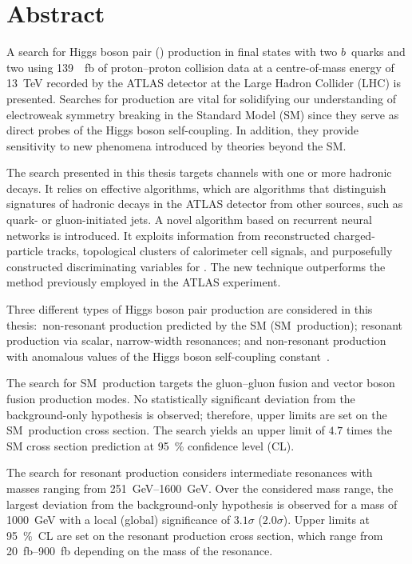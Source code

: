 \chapter*{Abstract}

A search for Higgs boson pair (\HH) production in final states with
two $b$~quarks and two \tauleptons using \SI{139}{\per\femto\barn} of
proton--proton collision data at a centre-of-mass energy of \SI{13}{\TeV}
recorded by the ATLAS detector at the Large Hadron Collider (LHC) is
presented. Searches for \HH production are vital for solidifying our
understanding of electroweak symmetry breaking in the Standard Model (SM) since
they serve as direct probes of the Higgs boson self-coupling. In addition, they
provide sensitivity to new phenomena introduced by theories beyond the SM.

The search presented in this thesis targets channels with one or more hadronic
\tauleptonC decays. It relies on effective \tauid algorithms, which are
algorithms that distinguish signatures of hadronic \tauleptonC decays in the
ATLAS detector from other sources, such as quark- or gluon-initiated jets. A
novel \tauid algorithm based on recurrent neural networks is introduced. It
exploits information from reconstructed charged-particle tracks, topological
clusters of calorimeter cell signals, and purposefully constructed
discriminating variables for \tauid. The new technique outperforms the method
previously employed in the ATLAS experiment.

Three different types of Higgs boson pair production are considered in this
thesis:~non-resonant \HH production predicted by the SM (SM~\HH production);
resonant \HH production via scalar, narrow-width resonances; and non-resonant
\HH production with anomalous values of the Higgs boson self-coupling
constant~\lambdahhh.

The search for SM~\HH production targets the gluon--gluon fusion and vector
boson fusion production modes. No statistically significant deviation from the
background-only hypothesis is observed; therefore, upper limits are set on the
SM~\HH production cross section. The search yields an upper limit of $4.7$ times
the SM cross section prediction at \SI{95}{\percent} confidence level (CL).

The search for resonant \HH production considers intermediate resonances with
masses ranging from \SIrange{251}{1600}{\GeV}. Over the considered mass range,
the largest deviation from the background-only hypothesis is observed for a mass
of \SI{1000}{\GeV} with a local (global) significance of $3.1\sigma$
($2.0\sigma$). Upper limits at \SI{95}{\percent}~CL are set on the resonant \HH
production cross section, which range from \SIrange{20}{900}{\femto\barn}
depending on the mass of the resonance.

